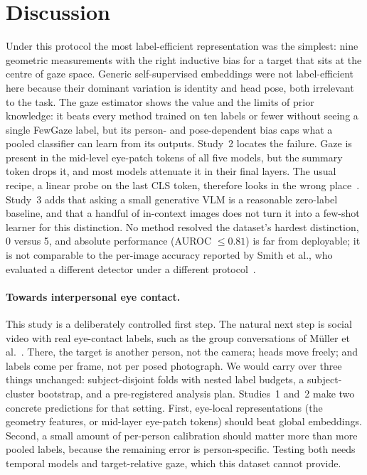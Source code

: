 \documentclass[10pt,twocolumn]{article}
\begin{document}
\section{Discussion}
Under this protocol the most label-efficient representation was the simplest: nine geometric measurements with the
right inductive bias for a target that sits at the centre of gaze space. Generic self-supervised embeddings were not
label-efficient here because their dominant variation is identity and head pose, both irrelevant to the task. The gaze
estimator shows the value and the limits of prior knowledge: it beats every method trained on ten labels or fewer
without seeing a single FewGaze label, but its person- and pose-dependent bias caps what a pooled classifier can learn
from its outputs. Study~2 locates the failure. Gaze is present in the mid-level eye-patch tokens of all five models, but the summary token drops it, and most models attenuate it in their final layers. The usual recipe, a linear probe on the last CLS token, therefore looks in the wrong place~\cite{elbanani2024probing}. Study~3 adds that asking a small generative VLM is a reasonable zero-label baseline, and that a handful of in-context images does not turn it into a few-shot learner for this distinction. No method resolved the dataset's hardest distinction,
0\textdegree{} versus 5\textdegree, and absolute performance (AUROC $\le0.81$) is far from deployable; it is not
comparable to the per-image accuracy reported by Smith et al., who evaluated a different detector under a different
protocol~\cite{smith2013gazelocking}.

\paragraph{Towards interpersonal eye contact.}
This study is a deliberately controlled first step. The natural next step is social video with real eye-contact labels, such as the group conversations of M\"uller et al.~\cite{muller2018robust,muller2021multimediate}. There, the target is another person, not the camera; heads move freely; and labels come per frame, not per posed photograph. We would carry over three things unchanged: subject-disjoint folds with nested label budgets, a subject-cluster bootstrap, and a pre-registered analysis plan. Studies~1 and~2 make two concrete predictions for that setting. First, eye-local representations (the geometry features, or mid-layer eye-patch tokens) should beat global embeddings. Second, a small amount of per-person calibration should matter more than more pooled labels, because the remaining error is person-specific. Testing both needs temporal models and target-relative gaze, which this dataset cannot provide.
\end{document}
